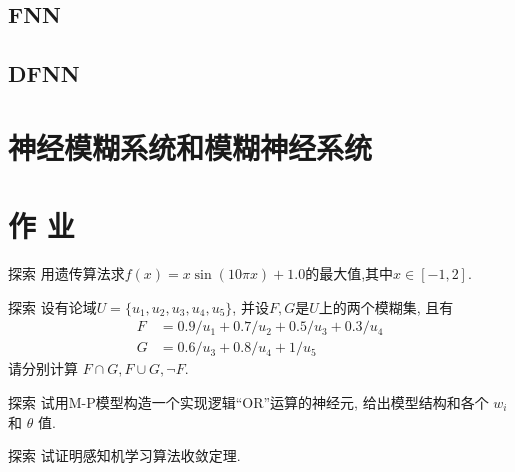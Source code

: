\subsection{FNN}
\subsection{DFNN}
\section{神经模糊系统和模糊神经系统}

\section{作      业}
\begin{custom}[explorecolor]{探索}
用遗传算法求$f(x)=x\sin(10πx)+1.0$的最大值,其中$x\in [-1,2]$.
\end{custom}
\begin{custom}[explorecolor]{探索}
设有论域$U=\{u_1, u_2, u_3, u_4, u_5\}$, 并设$F,G$是$U$上的两个模糊集, 且有
\begin{align*}
  F&=0.9/u_1+0.7/u_2+0.5/u_3+0.3/u_4\\
  G&=0.6/u_3+0.8/u_4+1/u_5
\end{align*}
请分别计算 $F\cap G, F\cup G,\neg F$.
\end{custom}
\begin{custom}[explorecolor]{探索}
试用M-P模型构造一个实现逻辑``OR''运算的神经元, 给出模型结构和各个 $w_{i} $ 和 $\theta $ 值.
\end{custom}
\begin{custom}[explorecolor]{探索}
试证明感知机学习算法收敛定理.
\end{custom}


